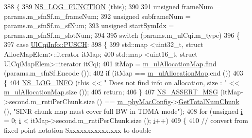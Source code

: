 \begin{DoxyCode}
388 \{
389   \hyperlink{log-macros-disabled_8h_a90b90d5bad1f39cb1b64923ea94c0761}{NS\_LOG\_FUNCTION} (\textcolor{keyword}{this});
390 
391         \textcolor{keywordtype}{unsigned} frameNum = params.m\_sfnSf.m\_frameNum;
392         \textcolor{keywordtype}{unsigned} subframeNum =  params.m\_sfnSf.m\_sfNum;
393         \textcolor{keywordtype}{unsigned} startSymIdx =  params.m\_sfnSf.m\_slotNum;
394 
395         \textcolor{keywordflow}{switch} (params.m\_ulCqi.m\_type)
396         \{
397                 \textcolor{keywordflow}{case} \hyperlink{structns3_1_1UlCqiInfo_a8241de30e4fdc8640e892ddf1e2a6c00a6d4b515df7c45a6843584459fbde26a7}{UlCqiInfo::PUSCH}:
398                 \{
399                         std::map <uint32\_t, struct AllocMapElem>::iterator itMap;
400                         std::map <uint16\_t, struct UlCqiMapElem>::iterator itCqi;
401                         itMap = \hyperlink{classns3_1_1MmWaveFlexTtiMacScheduler_ada4413d6867aaf28c116833458a62ea4}{m\_ulAllocationMap}.find (params.m\_sfnSf.Encode ());
402                         \textcolor{keywordflow}{if} (itMap == \hyperlink{classns3_1_1MmWaveFlexTtiMacScheduler_ada4413d6867aaf28c116833458a62ea4}{m\_ulAllocationMap}.end ())
403                         \{
404                                 \hyperlink{group__logging_gafbd73ee2cf9f26b319f49086d8e860fb}{NS\_LOG\_INFO} (\textcolor{keyword}{this} << \textcolor{stringliteral}{" Does not find info on allocation, size : 
      "} << \hyperlink{classns3_1_1MmWaveFlexTtiMacScheduler_ada4413d6867aaf28c116833458a62ea4}{m\_ulAllocationMap}.size ());
405                                 \textcolor{keywordflow}{return};
406                         \}
407                         \hyperlink{assert_8h_aff5ece9066c74e681e74999856f08539}{NS\_ASSERT\_MSG} (itMap->second.m\_rntiPerChunk.size () == 
      \hyperlink{classns3_1_1MmWaveMacScheduler_a24d7af4971d2e500fe543cefbafa2fd9}{m\_phyMacConfig}->\hyperlink{classns3_1_1MmWavePhyMacCommon_a97e82c809a351fea9d5058ac1bb4c3c6}{GetTotalNumChunk} (), \textcolor{stringliteral}{"SINR chunk map must cover full BW in
       TDMA mode"});
408                         \textcolor{keywordflow}{for} (\textcolor{keywordtype}{unsigned} \hyperlink{bernuolliDistribution_8m_a6f6ccfcf58b31cb6412107d9d5281426}{i} = 0; \hyperlink{bernuolliDistribution_8m_a6f6ccfcf58b31cb6412107d9d5281426}{i} < itMap->second.m\_rntiPerChunk.size (); 
      \hyperlink{bernuolliDistribution_8m_a6f6ccfcf58b31cb6412107d9d5281426}{i}++)
409                         \{
410                                 \textcolor{comment}{// convert from fixed point notation Sxxxxxxxxxxx.xxx to double}

\end{DoxyCode}
